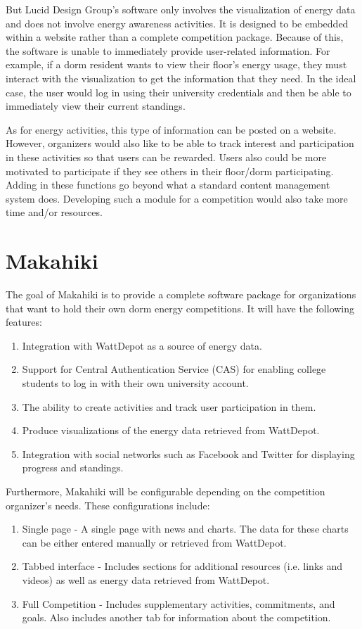 But Lucid Design Group's software only involves the visualization of energy data and does not involve energy awareness activities.  It is designed to be embedded within a website rather than a complete competition package.  Because of this, the software is unable to immediately provide user-related information.  For example, if a dorm resident wants to view their floor's energy usage, they must interact with the visualization to get the information that they need.  In the ideal case, the user would log in using their university credentials and then be able to immediately view their current standings.

As for energy activities, this type of information can be posted on a website.  However, organizers would also like to be able to track interest and participation in these activities so that users can be rewarded.  Users also could be more motivated to participate if they see others in their floor/dorm participating.  Adding in these functions go beyond what a standard content management system does.  Developing such a module for a competition would also take more time and/or resources.

\section{Makahiki}

The goal of Makahiki is to provide a complete software package for organizations that want to hold their own dorm energy competitions.  It will have the following features:

\begin{enumerate}
	\item Integration with WattDepot as a source of energy data.
	\item Support for Central Authentication Service (CAS) for enabling college students to log in with their own university account.
	\item The ability to create activities and track user participation in them.
	\item Produce visualizations of the energy data retrieved from WattDepot.
	\item Integration with social networks such as Facebook and Twitter for displaying progress and standings.
\end{enumerate}

Furthermore, Makahiki will be configurable depending on the competition organizer's needs.  These configurations include:

\begin{enumerate}
	\item Single page - A single page with news and charts.  The data for these charts can be either entered manually or retrieved from WattDepot.
	\item Tabbed interface - Includes sections for additional resources (i.e. links and videos) as well as energy data retrieved from WattDepot.
	\item Full Competition - Includes supplementary activities, commitments, and goals.  Also includes another tab for information about the competition.
\end{enumerate}

